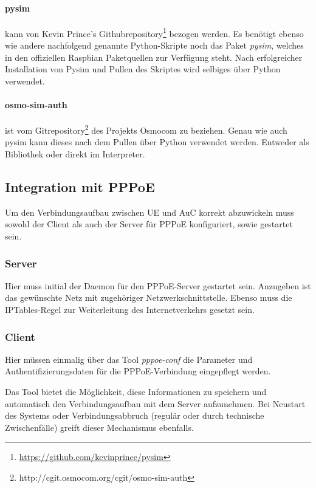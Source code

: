 	\paragraph{pysim} kann von Kevin Prince's Githubrepository\footnote{\url{https://github.com/kevinprince/pysim}} bezogen werden. Es benötigt ebenso
            wie andere nachfolgend genannte Python-Skripte noch das Paket \textit{pysim}, welches
            in den offiziellen Raspbian Paketquellen zur Verfügung steht. Nach erfolgreicher Installation
            von Pysim und Pullen des Skriptes wird selbiges über Python verwendet.

            \paragraph{osmo-sim-auth} ist vom Gitrepository\footnote{\url{}http://cgit.osmocom.org/cgit/osmo-sim-auth}
            des Projekts Osmocom zu  beziehen. Genau wie auch pysim kann dieses nach dem Pullen
            über Python verwendet werden. Entweder als Bibliothek oder direkt im Interpreter.

	\clearpage
	\subsection[Integration mit PPPoE (Schenkel)]{Integration mit PPPoE}
        Um den Verbindungsaufbau zwischen UE und \ac{AuC} korrekt abzuwickeln muss sowohl der Client
        als auch der Server für \ac{PPPoE} konfiguriert, sowie gestartet sein.

	\subsubsection[Server (Schenkel)]{Server}
         Hier muss initial der Daemon für den \ac{PPPoE}-Server gestartet sein. Anzugeben ist das gewünschte
         Netz mit zugehöriger Netzwerkschnittstelle. Ebenso muss die IPTables-Regel zur Weiterleitung
         des Internetverkehrs gesetzt sein.

         \subsubsection[Client (Schenkel)]{Client}
         Hier müssen einmalig über das Tool \textit{pppoe-conf} die Parameter und Authentifizierungsdaten
         für die \ac{PPPoE}-Verbindung eingepflegt werden.

         Das Tool bietet die Möglichkeit, diese Informationen
         zu speichern und automatisch den Verbindungsaufbau mit dem Server aufzunehmen. Bei Neustart
         des Systems oder Verbindungsabbruch (regulär oder durch technische Zwischenfälle) greift dieser
         Mechanismus ebenfalls.

